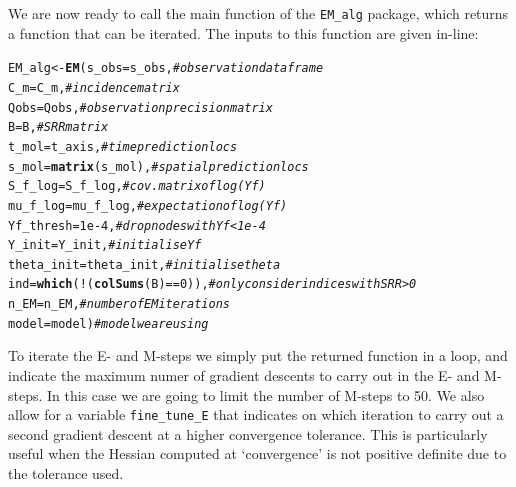 \documentclass[a4paper,11pt]{article}\usepackage[]{graphicx}\usepackage[]{color}
\makeatletter
\newcommand{\hlnum}[1]{\textcolor[rgb]{0.686,0.059,0.569}{#1}}%
\newcommand{\hlcom}[1]{\textcolor[rgb]{0.678,0.584,0.686}{\textit{#1}}}%
\newcommand{\hlopt}[1]{\textcolor[rgb]{0,0,0}{#1}}%
\newcommand{\hlstd}[1]{\textcolor[rgb]{0.345,0.345,0.345}{#1}}%
\newcommand{\hlkwb}[1]{\textcolor[rgb]{0.69,0.353,0.396}{#1}}%
\newcommand{\hlkwc}[1]{\textcolor[rgb]{0.333,0.667,0.333}{#1}}%
\newcommand{\hlkwd}[1]{\textcolor[rgb]{0.737,0.353,0.396}{\textbf{#1}}}%
\newenvironment{kframe}{%
 \def\at@end@of@kframe{}%
 \ifinner\ifhmode%
  \def\at@end@of@kframe{\end{minipage}}%
  \begin{minipage}{\columnwidth}%
 \fi\fi%
 \def\FrameCommand##1{\hskip\@totalleftmargin \hskip-\fboxsep
 \colorbox{shadecolor}{##1}\hskip-\fboxsep
     \hskip-\linewidth \hskip-\@totalleftmargin \hskip\columnwidth}%
 \MakeFramed {\advance\hsize-\width
   \@totalleftmargin\z@ \linewidth\hsize
   \@setminipage}}%
 {\par\unskip\endMakeFramed%
 \at@end@of@kframe}
\newenvironment{knitrout}{}{} %
\makeatother
\begin{document}
We are now ready to call the main function of the \texttt{EM\_alg} package, which returns a function that can be iterated. The inputs to this function are given in-line:


\begin{knitrout}
\color{fgcolor}\begin{kframe}
\begin{alltt}
\hlstd{EM_alg} \hlkwb{<-} \hlkwd{EM}\hlstd{(}\hlkwc{s_obs} \hlstd{= s_obs,}                  \hlcom{# observation data frame}
        \hlkwc{C_m} \hlstd{= C_m,}                           \hlcom{# incidence matrix}
        \hlkwc{Qobs} \hlstd{= Qobs,}                         \hlcom{# observation precision matrix}
        \hlkwc{B} \hlstd{= B,}                               \hlcom{# SRR matrix}
        \hlkwc{t_mol} \hlstd{= t_axis,}                      \hlcom{# time prediction locs}
        \hlkwc{s_mol} \hlstd{=} \hlkwd{matrix}\hlstd{(s_mol),}               \hlcom{# spatial prediction locs}
        \hlkwc{S_f_log} \hlstd{= S_f_log,}                   \hlcom{# cov. matrix of log(Yf)}
        \hlkwc{mu_f_log} \hlstd{= mu_f_log,}                 \hlcom{# expectation of log(Yf)}
        \hlkwc{Yf_thresh} \hlstd{=} \hlnum{1e-4}\hlstd{,}                    \hlcom{# drop nodes with Yf < 1e-4}
        \hlkwc{Y_init} \hlstd{=  Y_init,}                    \hlcom{# initialise Yf}
        \hlkwc{theta_init} \hlstd{= theta_init,}             \hlcom{# initialise theta}
        \hlkwc{ind} \hlstd{=} \hlkwd{which}\hlstd{(}\hlopt{!}\hlstd{(}\hlkwd{colSums}\hlstd{(B)} \hlopt{==} \hlnum{0}\hlstd{)),}     \hlcom{# only consider indices with SRR>0}
        \hlkwc{n_EM} \hlstd{= n_EM,}                         \hlcom{# number of EM iterations}
        \hlkwc{model} \hlstd{= model)}                       \hlcom{# model we are using}
\end{alltt}
\end{kframe}
\end{knitrout}

To iterate the E- and M-steps we simply put the returned function in a loop, and indicate the maximum numer of gradient descents to carry out in the E- and M- steps. In this case we are going to limit the number of M-steps to 50. We also allow for a variable \texttt{fine\_tune\_E} that indicates on which iteration to carry out a second gradient descent at a higher convergence tolerance. This is particularly useful when the Hessian computed at `convergence' is not positive definite due to the tolerance used. 
\end{document}
